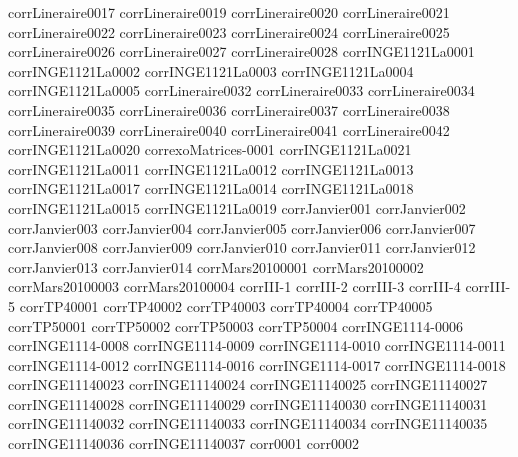 {corrLineraire0017}
{corrLineraire0019}
{corrLineraire0020}
{corrLineraire0021}
{corrLineraire0022}
{corrLineraire0023}
{corrLineraire0024}
{corrLineraire0025}
{corrLineraire0026}
{corrLineraire0027}
{corrLineraire0028}
{corrINGE1121La0001}
{corrINGE1121La0002}
{corrINGE1121La0003}
{corrINGE1121La0004}
{corrINGE1121La0005}
{corrLineraire0032}
{corrLineraire0033}
{corrLineraire0034}
{corrLineraire0035}
{corrLineraire0036}
{corrLineraire0037}
{corrLineraire0038}
{corrLineraire0039}
{corrLineraire0040}
{corrLineraire0041}
{corrLineraire0042}
{corrINGE1121La0020}
{correxoMatrices-0001}
{corrINGE1121La0021}
{corrINGE1121La0011}
{corrINGE1121La0012}
{corrINGE1121La0013}
{corrINGE1121La0017}
{corrINGE1121La0014}
{corrINGE1121La0018}
{corrINGE1121La0015}
{corrINGE1121La0019}
{corrJanvier001}
{corrJanvier002}
{corrJanvier003}
{corrJanvier004}
{corrJanvier005}
{corrJanvier006}
{corrJanvier007}
{corrJanvier008}
{corrJanvier009}
{corrJanvier010}
{corrJanvier011}
{corrJanvier012}
{corrJanvier013}
{corrJanvier014}
{corrMars20100001}
{corrMars20100002}
{corrMars20100003}
{corrMars20100004}
{corrIII-1}
{corrIII-2}
{corrIII-3}
{corrIII-4}
{corrIII-5}
{corrTP40001}
{corrTP40002}
{corrTP40003}
{corrTP40004}
{corrTP40005}
{corrTP50001}
{corrTP50002}
{corrTP50003}
{corrTP50004}
{corrINGE1114-0006}
{corrINGE1114-0008}
{corrINGE1114-0009}
{corrINGE1114-0010}
{corrINGE1114-0011}
{corrINGE1114-0012}
{corrINGE1114-0016}
{corrINGE1114-0017}
{corrINGE1114-0018}
{corrINGE11140023}
{corrINGE11140024}
{corrINGE11140025}
{corrINGE11140027}
{corrINGE11140028}
{corrINGE11140029}
{corrINGE11140030}
{corrINGE11140031}
{corrINGE11140032}
{corrINGE11140033}
{corrINGE11140034}
{corrINGE11140035}
{corrINGE11140036}
{corrINGE11140037}
{corr0001}
{corr0002}
